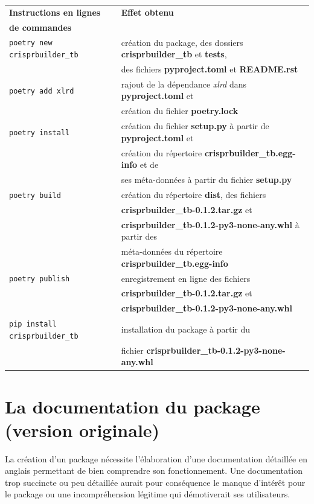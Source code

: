 \documentclass[twoside,a4paper,11pt,frenchb,openany]{report}
\begin{document}
\begin{tabular}{|l|l|}
\hline
\textbf{Instructions en lignes} & \textbf{Effet obtenu}\\
\textbf{de commandes} & \\
\hline
\texttt{poetry new crisprbuilder\_tb} & création du package, des dossiers \textbf{crisprbuilder\_tb} et \textbf{tests}, \\
& des fichiers \textbf{pyproject.toml} et \textbf{README.rst}\\
\hline
\texttt{poetry add xlrd} & rajout de la dépendance \textit{xlrd} dans \textbf{pyproject.toml} et \\
& création du fichier \textbf{poetry.lock}\\
\hline
\texttt{poetry install} & création du fichier \textbf{setup.py} à partir de \textbf{pyproject.toml} et\\
& création du répertoire \textbf{crisprbuilder\_tb.egg-info}  et de \\
& ses méta-données à partir du fichier \textbf{setup.py}\\
\hline
\texttt{poetry build} & création du répertoire \textbf{dist}, des fichiers \\
& \textbf{crisprbuilder\_tb-0.1.2.tar.gz} et \\
& \textbf{crisprbuilder\_tb-0.1.2-py3-none-any.whl} à partir des\\
& méta-données du répertoire  \textbf{crisprbuilder\_tb.egg-info}\\
\hline
\texttt{poetry publish} & enregistrement en ligne des fichiers\\
& \textbf{crisprbuilder\_tb-0.1.2.tar.gz} et \\
&  \textbf{crisprbuilder\_tb-0.1.2-py3-none-any.whl}\\
\hline
\texttt{pip install crisprbuilder\_tb} & installation du package à partir du \\
& fichier \textbf{crisprbuilder\_tb-0.1.2-py3-none-any.whl}\\
\hline
\end{tabular}



\chapter{La documentation du package \\(version originale)}


La création d'un package nécessite l'élaboration d'une documentation détaillée en anglais permettant de bien comprendre son fonctionnement. Une documentation trop succincte ou peu détaillée aurait pour conséquence le manque d'intérêt pour le package ou une incompréhension légitime qui démotiverait ses utilisateurs.
\end{document}
